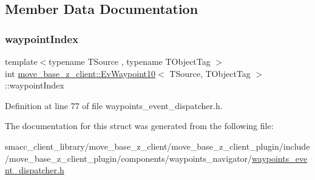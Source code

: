 \subsection{Member Data Documentation}
\mbox{\label{structmove__base__z__client_1_1EvWaypoint10_a92230b8695f3cfe773cd79fbe81ae294}} 
\subsubsection{\texorpdfstring{waypoint\+Index}{waypointIndex}}
{\footnotesize\ttfamily template$<$typename T\+Source , typename T\+Object\+Tag $>$ \\
int \hyperlink{structmove__base__z__client_1_1EvWaypoint10}{move\+\_\+base\+\_\+z\+\_\+client\+::\+Ev\+Waypoint10}$<$ T\+Source, T\+Object\+Tag $>$\+::waypoint\+Index}



Definition at line 77 of file waypoints\+\_\+event\+\_\+dispatcher.\+h.



The documentation for this struct was generated from the following file\+:\begin{DoxyCompactItemize}
\item 
smacc\+\_\+client\+\_\+library/move\+\_\+base\+\_\+z\+\_\+client/move\+\_\+base\+\_\+z\+\_\+client\+\_\+plugin/include/move\+\_\+base\+\_\+z\+\_\+client\+\_\+plugin/components/waypoints\+\_\+navigator/\hyperlink{waypoints__event__dispatcher_8h}{waypoints\+\_\+event\+\_\+dispatcher.\+h}\end{DoxyCompactItemize}
